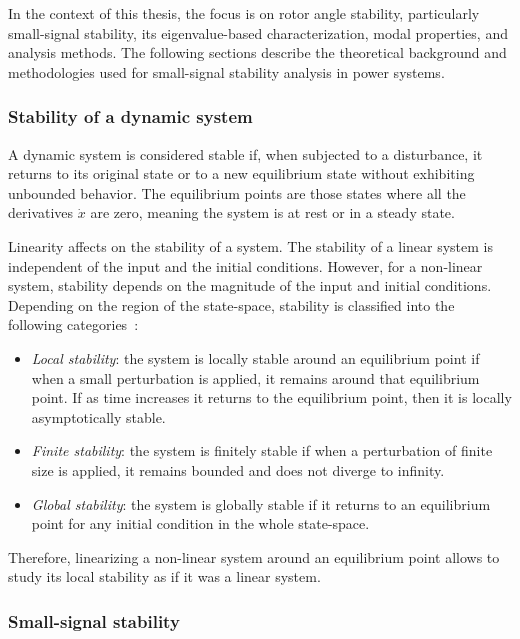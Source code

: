 In the context of this thesis, the focus is on rotor angle stability, particularly small-signal stability, its eigenvalue-based characterization, 
modal properties, and analysis methods. The following sections describe the theoretical background and methodologies used for small-signal stability 
analysis in power systems. 

\subsubsection{Stability of a dynamic system}

A dynamic system is considered stable if, when subjected to a disturbance, it returns to its original state or to a new equilibrium state without
exhibiting unbounded behavior. The equilibrium points are those states where all the derivatives $\dot{x}$ are zero, meaning the system is at rest
or in a steady state. 

Linearity affects on the stability of a system. The stability of a linear system is independent of the input and the initial conditions.
However, for a non-linear system, stability depends on the magnitude of the input and initial conditions. Depending on the region of the state-space,
stability is classified into the following categories~\cite{StabilityAndControlKundur}:

\begin{itemize}
  \item \textit{Local stability}: the system is locally stable around an equilibrium point if when a small perturbation is applied,
  it remains around that equilibrium point. If as time increases it returns to the equilibrium point, then it is locally asymptotically stable.
  \item \textit{Finite stability}: the system is finitely stable if when a perturbation of finite size is applied, it remains bounded and does not diverge to infinity.
  \item \textit{Global stability}: the system is globally stable if it returns to an equilibrium point for any initial condition in the whole state-space.
\end{itemize}

Therefore, linearizing a non-linear system around an equilibrium point allows to study its local stability as if it was a linear system. 

\subsubsection{Small-signal stability}

